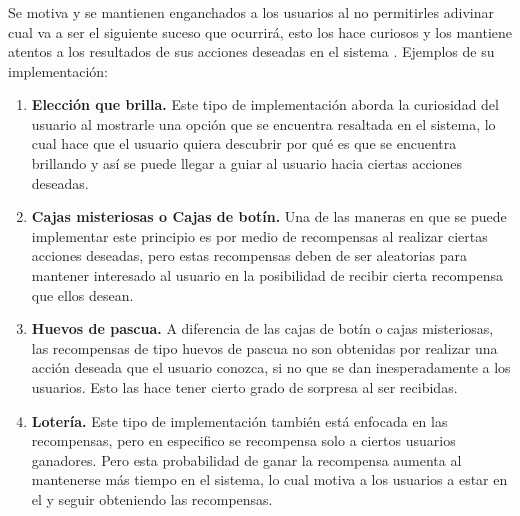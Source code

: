 \subsubsection{\principioVII}
\label{subsec:principioVII}

 Se motiva y se mantienen enganchados a los usuarios al no permitirles adivinar cual va a ser
 el siguiente suceso que ocurrirá, esto los hace curiosos y los mantiene atentos a los resultados
 de sus acciones deseadas en el sistema \cite[p. 273]{Octalysis}. Ejemplos de su implementación:
       
    \begin{enumerate}
    \item \textbf{Elección que brilla.}\cite[p. 297]{Octalysis}
        Este tipo de implementación aborda la curiosidad del usuario al mostrarle una opción
        que se encuentra resaltada en el sistema, lo cual hace que el usuario quiera descubrir
        por qué es que se encuentra brillando y así se puede llegar a guiar al usuario hacia
        ciertas acciones deseadas.
           
    \item \textbf{Cajas misteriosas o Cajas de botín.}\cite[p. 299]{IOctalysis}
        Una de las maneras en que se puede implementar este principio es por medio de recompensas
        al realizar ciertas acciones deseadas, pero estas recompensas deben de ser aleatorias
        para mantener interesado al usuario en la posibilidad de recibir cierta recompensa
        que ellos desean.
           
    \item \textbf{Huevos de pascua.}\cite[p. 301]{Octalysis}
        A diferencia de las cajas de botín o cajas misteriosas, las recompensas de tipo huevos
        de pascua no son obtenidas por realizar una acción deseada que el usuario conozca,
        si no que se dan inesperadamente a los usuarios. Esto las hace tener cierto grado
        de sorpresa al ser recibidas.
           
    \item \textbf{Lotería.}\cite[p. 305]{Octalysis}
        Este tipo de implementación también está enfocada en las recompensas, pero en especifico
        se recompensa solo a ciertos usuarios ganadores. Pero esta probabilidad de ganar la
        recompensa aumenta al mantenerse más tiempo en el sistema, lo cual motiva a los usuarios
        a estar en el y seguir obteniendo las recompensas.
    \end{enumerate}

